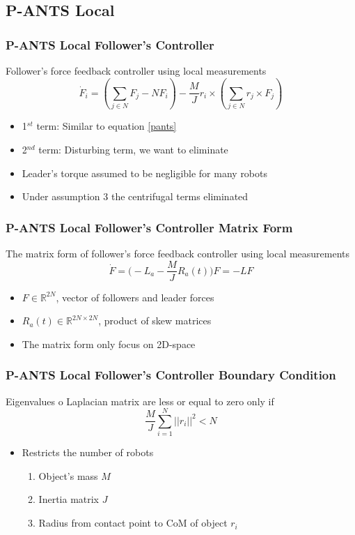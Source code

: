 \documentclass{beamer}
\begin{document}
\subsection{P-ANTS Local}
\begin{frame}
\frametitle{P-ANTS Local Follower's Controller}
Follower's force feedback controller using local measurements
\begin{equation}\label{pantsdlm}
\dot{F}_i=(\sum_{j \in N}F_j-NF_i)-\frac{M}{J}r_i\times (\sum_{j\in N}r_j\times F_j)
\end{equation}
\begin{itemize}
\item 1$^{st}$ term: Similar to equation \ref{pants}
\item 2$^{nd}$ term: Disturbing term, we want to eliminate 
\item Leader's torque assumed to be negligible for many robots
\item Under assumption 3 the centrifugal terms eliminated
\end{itemize}
\end{frame}


\begin{frame}
\frametitle{P-ANTS Local Follower's Controller Matrix Form}
The matrix form of follower's force feedback controller using local measurements
\begin{equation}\label{mpants}
\dot{F}=\Bigg( -L_a-\frac{M}{J}R_a(t) \Bigg)F = -LF
\end{equation}
\begin{itemize}
\item $F \in \mathbb{R}^{2N}$, vector of followers and leader forces
\item $R_a(t) \in \mathbb{R}^{2N\times 2N}$, product of skew matrices
\item The matrix form only focus on 2D-space
\end{itemize}
\end{frame}


\begin{frame}
\frametitle{P-ANTS Local Follower's Controller Boundary Condition}
Eigenvalues o Laplacian matrix are less or equal to zero only if 
\begin{equation}
\frac{M}{J}\sum_{i=1}^N||r_i||^2<N
\end{equation}
\begin{itemize}
\item Restricts the number of robots 
\begin{enumerate}
\item Object's mass $M$
\item Inertia matrix $J$
\item Radius from contact point to CoM of object $r_i$
\end{enumerate}
\end{itemize}
\end{frame}
\end{document}
